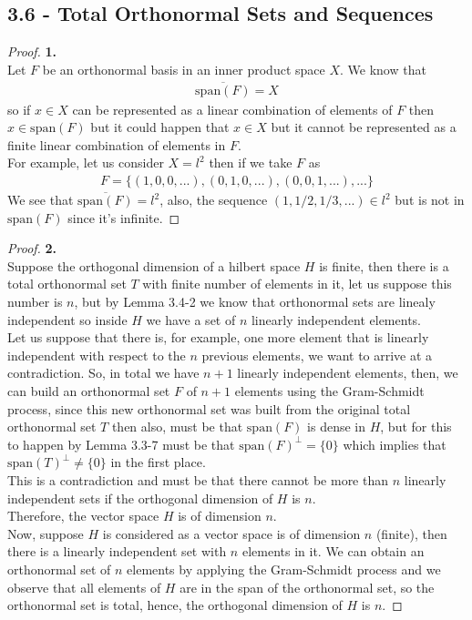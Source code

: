 \documentclass[11pt]{article}
\newcommand{\Span}[1]{\text{span}(#1)}
\theoremstyle{definition}
\begin{document}
\cleardoublepage
\subsection*{3.6 - Total Orthonormal Sets and Sequences}
\begin{proof}{\textbf{1.}}\\
Let $F$ be an orthonormal basis in an inner product space $X$. We know that
\begin{align*}
    \overline{\Span{F}} = X
\end{align*}
so if $x \in X$ can be represented as a linear combination of elements of $F$
then $x \in \Span{F}$ but it could happen that $x \in X$ but it cannot be
represented as a finite linear combination of elements in $F$.
\\
For example, let us consider $X = l^2$ then if we take $F$ as
\begin{align*}
    F = \{
        (1,0, 0, ...), 
        (0, 1, 0, ...),
        (0, 0, 1, ...),
        ...
    \}
\end{align*}
We see that $\overline{\Span{F}} = l^2$, also, the sequence 
$(1, 1/2, 1/3, ...) \in l^2$ but is not in $\Span{F}$ since it's infinite.
\end{proof}

\begin{proof}{\textbf{2.}}\\
Suppose the orthogonal dimension of a hilbert space $H$ is finite, then there
is a total orthonormal set $T$ with finite number of elements in it,
let us suppose this number is $n$, but by Lemma 3.4-2 we know that orthonormal
sets are linealy independent so inside $H$ we have a set of $n$ linearly
independent elements.
\\
Let us suppose that there is, for example, one more element that is linearly
independent with respect to the $n$ previous elements, we want to arrive at 
a contradiction. So, in total we have $n + 1$ linearly independent elements,
then, we can build an orthonormal set $F$ of $n + 1$ elements using the
Gram-Schmidt process, since this new orthonormal set was built from the
original total orthonormal set $T$ then also, must be that $\Span{F}$ is
dense in $H$, but for this to happen by Lemma 3.3-7 must be that
$\Span{F}^\perp = \{0\}$ which implies that $\Span{T}^\perp \neq \{0\}$ in the
first place.
\\
This is a contradiction and must be that there cannot be more than $n$
linearly independent sets if the orthogonal dimension of $H$ is $n$.
\\
Therefore, the vector space $H$ is of dimension $n$.
\\
Now, suppose $H$ is considered as a vector space is of dimension $n$ (finite),
then there is a linearly independent set with $n$ elements in it.
We can obtain an orthonormal set of $n$ elements by applying the Gram-Schmidt
process and we observe that all elements of $H$ are in the span of the
orthonormal set, so the orthonormal set is total, hence, the orthogonal
dimension of $H$ is $n$.
\end{proof}
\end{document}
